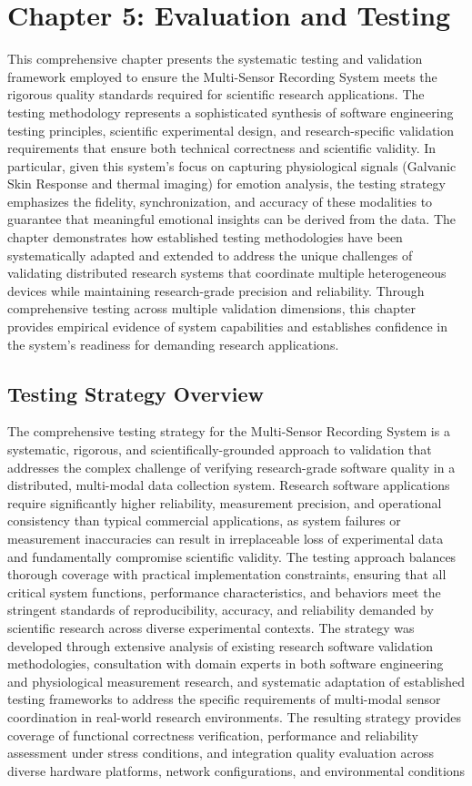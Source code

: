 \label{chap:5} \chapter{Chapter 5: Evaluation and Testing} This comprehensive chapter presents the systematic testing and validation framework employed to ensure the Multi-Sensor Recording System meets the rigorous quality standards required for scientific research applications. The testing methodology represents a sophisticated synthesis of software engineering testing principles, scientific experimental design, and research-specific validation requirements that ensure both technical correctness and scientific validity. In particular, given this system's focus on capturing physiological signals (Galvanic Skin Response and thermal imaging) for emotion analysis, the testing strategy emphasizes the fidelity, synchronization, and accuracy of these modalities to guarantee that meaningful emotional insights can be derived from the data. The chapter demonstrates how established testing methodologies have been systematically adapted and extended to address the unique challenges of validating distributed research systems that coordinate multiple heterogeneous devices while maintaining research-grade precision and reliability. Through comprehensive testing across multiple validation dimensions, this chapter provides empirical evidence of system capabilities and establishes confidence in the system's readiness for demanding research applications. \section{Testing Strategy Overview} The comprehensive testing strategy for the Multi-Sensor Recording System is a systematic, rigorous, and scientifically-grounded approach to validation that addresses the complex challenge of verifying research-grade software quality in a distributed, multi-modal data collection system. Research software applications require significantly higher reliability, measurement precision, and operational consistency than typical commercial applications, as system failures or measurement inaccuracies can result in irreplaceable loss of experimental data and fundamentally compromise scientific validity. The testing approach balances thorough coverage with practical implementation constraints, ensuring that all critical system functions, performance characteristics, and behaviors meet the stringent standards of reproducibility, accuracy, and reliability demanded by scientific research across diverse experimental contexts. The strategy was developed through extensive analysis of existing research software validation methodologies, consultation with domain experts in both software engineering and physiological measurement research, and systematic adaptation of established testing frameworks to address the specific requirements of multi-modal sensor coordination in real-world research environments. The resulting strategy provides coverage of functional correctness verification, performance and reliability assessment under stress conditions, and integration quality evaluation across diverse hardware platforms, network configurations, and environmental conditions 